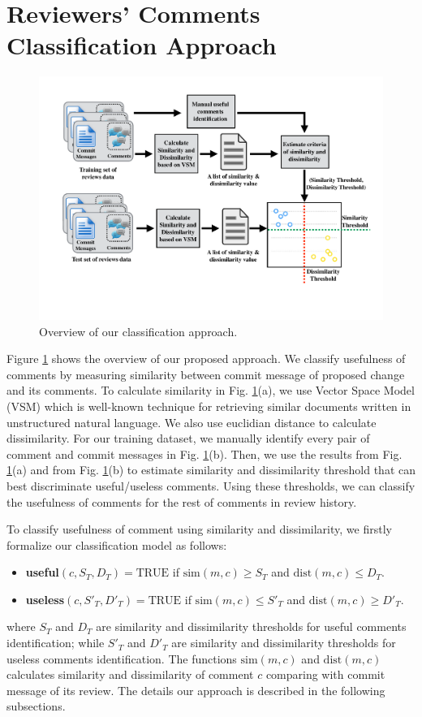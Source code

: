 \documentclass[conference]{IEEEtran}
\begin{document}
\section{Reviewers' Comments Classification Approach}
\begin{figure}[!t]
\centering
\includegraphics[scale=0.35, trim = 50 90 0 30, clip=true]{overview2}
\caption{Overview of our classification approach.}
\label{fig:overview}
\end{figure}

Figure \ref{fig:overview} shows the overview of our proposed approach. We classify usefulness of comments by measuring similarity between commit message of proposed change and its comments. To calculate similarity in Fig. \ref{fig:overview}(a), we use Vector Space Model (VSM) which is well-known technique for retrieving similar documents written in unstructured natural language. We also use euclidian distance to calculate dissimilarity. For our training dataset, we manually identify every pair of comment and commit messages in Fig. \ref{fig:overview}(b). Then, we use the results from Fig. \ref{fig:overview}(a) and from Fig. \ref{fig:overview}(b) to estimate similarity and dissimilarity threshold that can best discriminate useful/useless comments. Using these thresholds, we can classify the usefulness of comments for the rest of comments in review history. 

To classify usefulness of comment using similarity and dissimilarity, we firstly formalize our classification model as follows:
\begin{itemize}
\item \textbf{useful}$(c,S_T,D_T)= \mathrm{TRUE}$ if $\mathrm{sim}(m,c) \geq S_T$ and $\mathrm{dist}(m,c) \leq D_T$.
\item \textbf{useless}$(c,S'_T,D'_T)= \mathrm{TRUE}$  if $\mathrm{sim}(m,c) \leq  S'_T$ and $\mathrm{dist}(m,c) \geq D'_T$.
\end{itemize}
where $S_T$ and $D_T$ are similarity and dissimilarity thresholds for useful comments identification; while $S'_T$ and $D'_T$ are similarity and dissimilarity thresholds for useless comments identification. The functions $\mathrm{sim}(m,c)$ and $\mathrm{dist}(m,c)$ calculates similarity and dissimilarity of comment $c$ comparing with commit message of its review. The details our approach is described in the following subsections.
\end{document}
